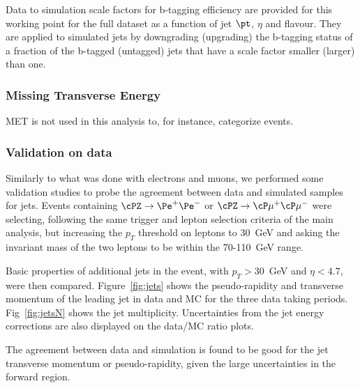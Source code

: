 Data to simulation scale factors for b-tagging efficiency are provided for this working point for the full dataset as a function of jet $\pt$, $\eta$ and flavour.
They are applied to simulated jets by downgrading (upgrading) the b-tagging status of a fraction of the b-tagged (untagged) jets that have a scale factor smaller (larger) than one. %

\subsubsection{Missing Transverse Energy}
MET is not used in this analysis to, for instance, categorize events.

\subsubsection{Validation on data}
Similarly to what was done with electrons and muons, we performed some validation studies to probe the agreement between data and simulated samples for jets. 
Events containing $\Zee$ or $\cPZ\rightarrow\cP\mu^{+}\cP\mu^{-}$ were selecting, following the same trigger and lepton selection criteria of the main analysis, but increasing the $p_T$ threshold on leptons  to 30~GeV and asking the invariant mass of the two leptons to be within the 70-110~GeV range.

Basic properties of additional jets in the event,  with $p_T>30$~GeV and $\eta<4.7$, were then compared. Figure~\ref{fig:jets} shows the pseudo-rapidity and transverse momentum of the leading jet in data and MC for the three data taking periods. Fig~\ref{fig:jetsN} shows the jet multiplicity.
Uncertainties from the jet energy corrections are also displayed on the data/MC ratio plots. %

The agreement between data and simulation is found to be good for the jet transverse momentum or pseudo-rapidity, given the large uncertainties in the forward region. 

